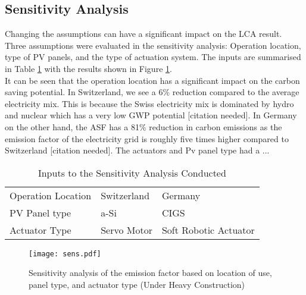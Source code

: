 \subsection{Sensitivity Analysis}

Changing the assumptions can have a significant impact on the LCA result. Three assumptions were evaluated in the sensitivity analysis: Operation location, type of PV panels, and the type of actuation system. The inputs are summarised in Table \ref{tab:sens} with the results shown in Figure \ref{fig:sens}. \\

It can be seen that the operation location has a significant impact on the carbon saving potential. In Switzerland, we see a 6\% reduction compared to the average electricity mix. This is because the Swiss electricity mix is dominated by hydro and nuclear which has a very low GWP potential [citation needed]. In Germany on the other hand, the ASF has a 81\% reduction in carbon emissions as the emission factor of the electricity grid is roughly five times higher compared to Switzerland [citation needed]. The actuators and Pv panel type had a ...



\begin{table}
\centering
\begin{tabular}{lll}
\hline
Operation Location  & Switzerland & Germany \\
PV Panel type  & a-Si        & CIGS    \\
Actuator Type           & Servo Motor       & Soft Robotic Actuator   \\
\end{tabular}
\caption{Inputs to the Sensitivity Analysis Conducted}
\label{tab:sens}
\end{table}

\begin{figure}[H]
\begin{center}
\texttt{[image: sens.pdf]}
\caption{Sensitivity analysis of the emission factor based on location of use, panel type, and actuator type (Under Heavy Construction)}
\label{fig:sens}
\end{center}
\end{figure}






